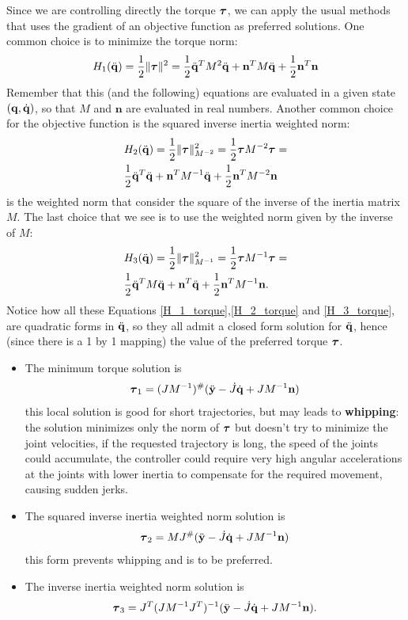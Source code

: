 \documentclass[10pt, a4paper]{report}
\newcommand{\q}{{\mathbf q}}
\begin{document}
Since we are controlling directly the torque ${\boldsymbol{\tau}}$, we can apply the usual methods that uses the gradient of an objective function as preferred solutions. One common choice is to minimize the torque norm:\begin{equation}\label{H_1_torque}
    H_1({\ddot{\mathbf q}})=\frac{1}{2}\|{\boldsymbol{\tau}}\|^2=\frac{1}{2}{\ddot{\mathbf q}}^TM^2{\ddot{\mathbf q}}+\mathbf n^TM{\ddot{\mathbf q}}+\frac{1}{2}\mathbf n^T\mathbf n
\end{equation}
Remember that this (and the following) equations are evaluated in a given state $(\q,\dq)$, so that $M$ and $\mathbf n$ are evaluated in real numbers.
Another common choice for the objective function is the squared inverse inertia weighted norm:\begin{align}
    &H_2({\ddot{\mathbf q}})=\frac{1}{2}\|{\boldsymbol{\tau}}\|^2_{M^{-2}}=\frac{1}{2}{\boldsymbol{\tau}} M^{-2}{\boldsymbol{\tau}}=\\
    &\label{H_2_torque}\frac{1}{2}{\ddot{\mathbf q}}^T{\ddot{\mathbf q}}+\mathbf n^TM^{-1}{\ddot{\mathbf q}}+\frac{1}{2}\mathbf n^TM^{-2}\mathbf n
\end{align}
is the weighted norm that consider the square of the inverse of the inertia matrix $M$. The last choice that we see is to use the weighted norm given by the inverse of $M$:
\begin{align}
    &H_3({\ddot{\mathbf q}})=\frac{1}{2}\|{\boldsymbol{\tau}}\|^2_{M^{-1}}=\frac{1}{2}{\boldsymbol{\tau}} M^{-1}{\boldsymbol{\tau}}=\\
    &\label{H_3_torque}\frac{1}{2}{\ddot{\mathbf q}}^TM{\ddot{\mathbf q}}+\mathbf n^T{\ddot{\mathbf q}}+\frac{1}{2}\mathbf n^TM^{-1}\mathbf n.
\end{align}
Notice how all these Equations \eqref{H_1_torque},\eqref{H_2_torque} and \eqref{H_3_torque}, are quadratic forms in ${\ddot{\mathbf q}}$, so they all admit a closed form solution for ${\ddot{\mathbf q}}$, hence (since there is a 1 by 1 mapping) the value of the preferred torque ${\boldsymbol{\tau}}$.\begin{itemize}
    \item The minimum torque solution is \begin{equation}
        {\boldsymbol{\tau}}_1=(JM^{-1})^\#({\ddot{\mathbf y}}-\dot J{\dot{\mathbf q}}+JM^{-1}\mathbf n)
    \end{equation}
    this local solution is good for short trajectories, but may leads to \textbf{whipping}: the solution minimizes only the norm of ${\boldsymbol{\tau}}$ but doesn't try to minimize the joint velocities, if the requested trajectory is long, the speed of the joints could accumulate, the controller could require very high angular accelerations at the joints with lower inertia to compensate for the required movement, causing sudden jerks.
    \item The squared inverse inertia weighted norm solution is\begin{equation}
        {\boldsymbol{\tau}}_2=MJ^\#({\ddot{\mathbf y}}-\dot J{\dot{\mathbf q}}+JM^{-1}\mathbf n)
    \end{equation}
    this form prevents whipping and is to be preferred.
    \item The inverse inertia weighted norm solution is\begin{equation}
        {\boldsymbol{\tau}}_3=J^T(JM^{-1}J^T)^{-1}({\ddot{\mathbf y}}-\dot J{\dot{\mathbf q}}+JM^{-1}\mathbf n).
    \end{equation}
\end{itemize}
\end{document}
